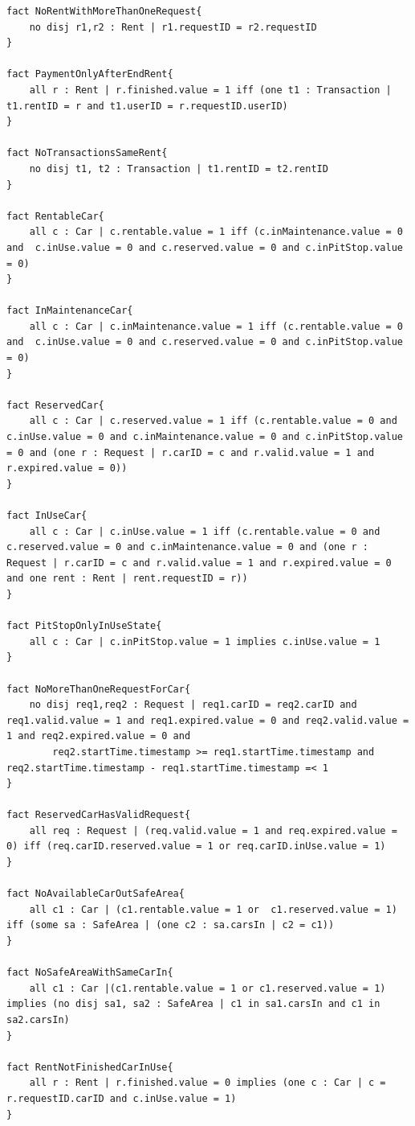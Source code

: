 \begin{lstlisting}[breaklines=true]
fact NoRentWithMoreThanOneRequest{
	no disj r1,r2 : Rent | r1.requestID = r2.requestID
}

fact PaymentOnlyAfterEndRent{
	all r : Rent | r.finished.value = 1 iff (one t1 : Transaction | t1.rentID = r and t1.userID = r.requestID.userID)
}

fact NoTransactionsSameRent{
	no disj t1, t2 : Transaction | t1.rentID = t2.rentID
}

fact RentableCar{
	all c : Car | c.rentable.value = 1 iff (c.inMaintenance.value = 0 and  c.inUse.value = 0 and c.reserved.value = 0 and c.inPitStop.value = 0)
}

fact InMaintenanceCar{
	all c : Car | c.inMaintenance.value = 1 iff (c.rentable.value = 0 and  c.inUse.value = 0 and c.reserved.value = 0 and c.inPitStop.value = 0)
}

fact ReservedCar{
	all c : Car | c.reserved.value = 1 iff (c.rentable.value = 0 and  c.inUse.value = 0 and c.inMaintenance.value = 0 and c.inPitStop.value = 0 and (one r : Request | r.carID = c and r.valid.value = 1 and r.expired.value = 0))
}

fact InUseCar{
	all c : Car | c.inUse.value = 1 iff (c.rentable.value = 0 and  c.reserved.value = 0 and c.inMaintenance.value = 0 and (one r : Request | r.carID = c and r.valid.value = 1 and r.expired.value = 0 and one rent : Rent | rent.requestID = r))
}

fact PitStopOnlyInUseState{
	all c : Car | c.inPitStop.value = 1 implies c.inUse.value = 1
}

fact NoMoreThanOneRequestForCar{
	no disj req1,req2 : Request | req1.carID = req2.carID and req1.valid.value = 1 and req1.expired.value = 0 and req2.valid.value = 1 and req2.expired.value = 0 and
		req2.startTime.timestamp >= req1.startTime.timestamp and req2.startTime.timestamp - req1.startTime.timestamp =< 1
}

fact ReservedCarHasValidRequest{
	all req : Request | (req.valid.value = 1 and req.expired.value = 0) iff (req.carID.reserved.value = 1 or req.carID.inUse.value = 1)
}

fact NoAvailableCarOutSafeArea{
	all c1 : Car | (c1.rentable.value = 1 or  c1.reserved.value = 1) iff (some sa : SafeArea | (one c2 : sa.carsIn | c2 = c1))
}

fact NoSafeAreaWithSameCarIn{
	all c1 : Car |(c1.rentable.value = 1 or c1.reserved.value = 1) implies (no disj sa1, sa2 : SafeArea | c1 in sa1.carsIn and c1 in sa2.carsIn)
}

fact RentNotFinishedCarInUse{
	all r : Rent | r.finished.value = 0 implies	(one c : Car | c = r.requestID.carID and c.inUse.value = 1)
}


\end{lstlisting}
